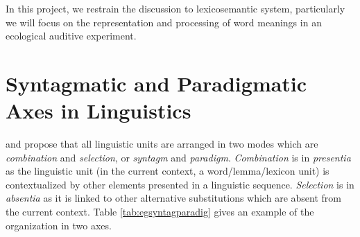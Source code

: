 In this project, we restrain the discussion to lexicosemantic system, particularly we will focus on the representation and processing of word meanings in an ecological auditive experiment. 

\section{Syntagmatic and Paradigmatic Axes in Linguistics}
\label{sec:IntroSyntagandParaAxies}
\textcite{jakobsonFundamentalsLanguage1963} and \textcite{desaussureCoursLinguistiqueGenerale1969} propose that all linguistic units are arranged in two modes which are \emph{combination} and \emph{selection}, or \emph{syntagm} and \emph{paradigm}. \emph{Combination} is in \emph{presentia} as the linguistic unit (in the current context, a word\slash lemma\slash lexicon unit) is contextualized by other elements presented in a linguistic sequence. \emph{Selection} is in \emph{absentia} as it is linked to other alternative substitutions which are absent from the current context. Table \ref{tab:egsyntagparadig} gives an example of the organization in two axes.

